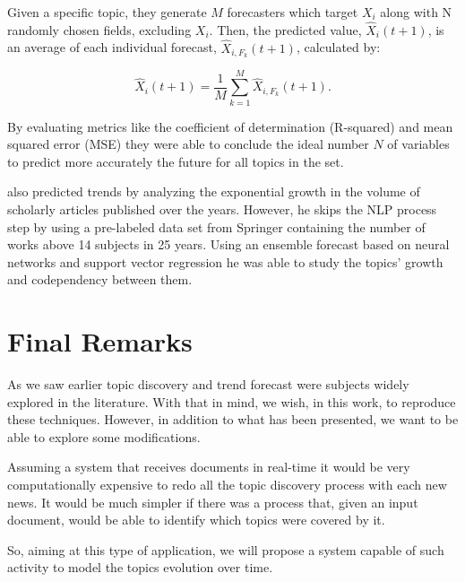 Given a specific topic, they generate $M$ forecasters which target $X_{i}$ along with N randomly chosen fields, excluding $X_{i}$. Then, the predicted value, $\hat{X}_{i}(t+1)$, is an average of each individual forecast, $\hat{X}_{i, F_{k}}(t+1)$, calculated by:

\begin{equation}
	\hat{X}_{i}(t+1) = \dfrac{1}{M} \sum_{k=1}^{M}\hat{X}_{i, F_{k}}(t+1)\text{.}
\end{equation}

By evaluating metrics like the coefficient of determination (R-squared) and mean squared error (MSE) they were able to conclude the ideal number $N$ of variables to predict more accurately the future for all topics in the set.

 also predicted trends by analyzing the exponential growth in the volume of scholarly articles published over the years. However, he skips the NLP process step by using a pre-labeled data set from Springer containing the number of works above 14 subjects in 25 years. Using an ensemble forecast based on neural networks and support vector regression he was able to study the topics' growth and codependency between them.


\section{Final Remarks}

As we saw earlier topic discovery and trend forecast were subjects widely explored in the literature. With that in mind, we wish, in this work, to reproduce these techniques. However, in addition to what has been presented, we want to be able to explore some modifications.

Assuming a system that receives documents in real-time
it would be very computationally expensive to redo all the topic discovery process with each new news. It would be much simpler if there was a process that, given an input document, would be able to identify 
which topics were covered by it.

So, aiming at this type of application, we will propose a system capable of such activity to model the topics evolution over time.


